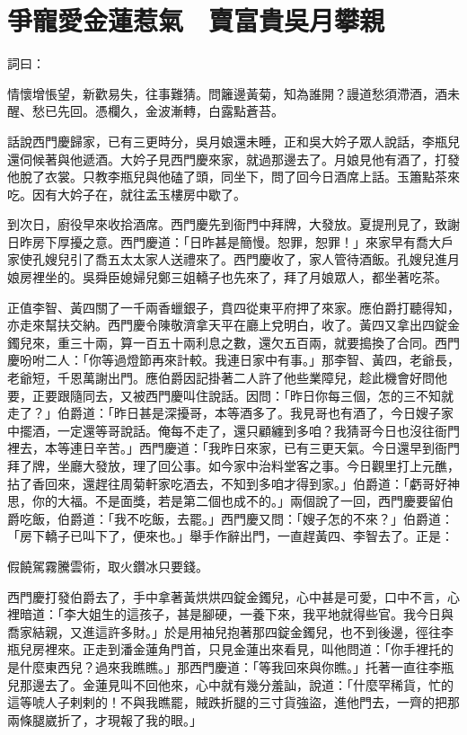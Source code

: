 %

\chapter{爭寵愛金蓮惹氣　賣富貴吳月攀親}

詞曰：

情懷增悵望，新歡易失，往事難猜。問籬邊黃菊，知為誰開？謾道愁須滯酒，酒未醒、愁已先回。憑欄久，金波漸轉，白露點蒼苔。

話說西門慶歸家，已有三更時分，吳月娘還未睡，正和吳大妗子眾人說話，李瓶兒還伺候著與他遞酒。大妗子見西門慶來家，就過那邊去了。月娘見他有酒了，打發他脫了衣裳。只教李瓶兒與他磕了頭，同坐下，問了回今日酒席上話。玉簫點茶來吃。因有大妗子在，就往孟玉樓房中歇了。

到次日，廚役早來收拾酒席。西門慶先到衙門中拜牌，大發放。夏提刑見了，致謝日昨房下厚擾之意。西門慶道：「日昨甚是簡慢。恕罪，恕罪！」來家早有喬大戶家使孔嫂兒引了喬五太太家人送禮來了。西門慶收了，家人管待酒飯。孔嫂兒進月娘房裡坐的。吳舜臣媳婦兒鄭三姐轎子也先來了，拜了月娘眾人，都坐著吃茶。

正值李智、黃四關了一千兩香蠟銀子，賁四從東平府押了來家。應伯爵打聽得知，亦走來幫扶交納。西門慶令陳敬濟拿天平在廳上兌明白，收了。黃四又拿出四錠金鐲兒來，重三十兩，算一百五十兩利息之數，還欠五百兩，就要搗換了合同。西門慶吩咐二人：「你等過燈節再來計較。我連日家中有事。」那李智、黃四，老爺長，老爺短，千恩萬謝出門。應伯爵因記掛著二人許了他些業障兒，趁此機會好問他要，正要跟隨同去，又被西門慶叫住說話。因問：「昨日你每三個，怎的三不知就走了？」伯爵道：「昨日甚是深擾哥，本等酒多了。我見哥也有酒了，今日嫂子家中擺酒，一定還等哥說話。俺每不走了，還只顧纏到多咱？我猜哥今日也沒往衙門裡去，本等連日辛苦。」西門慶道：「我昨日來家，已有三更天氣。今日還早到衙門拜了牌，坐廳大發放，理了回公事。如今家中治料堂客之事。今日觀里打上元醮，拈了香回來，還趕往周菊軒家吃酒去，不知到多咱才得到家。」伯爵道：「虧哥好神思，你的大福。不是面獎，若是第二個也成不的。」兩個說了一回，西門慶要留伯爵吃飯，伯爵道：「我不吃飯，去罷。」西門慶又問：「嫂子怎的不來？」伯爵道：「房下轎子已叫下了，便來也。」舉手作辭出門，一直趕黃四、李智去了。正是：

假饒駕霧騰雲術，取火鑽冰只要錢。

西門慶打發伯爵去了，手中拿著黃烘烘四錠金鐲兒，心中甚是可愛，口中不言，心裡暗道：「李大姐生的這孩子，甚是腳硬，一養下來，我平地就得些官。我今日與喬家結親，又進這許多財。」於是用袖兒抱著那四錠金鐲兒，也不到後邊，徑往李瓶兒房裡來。正走到潘金蓮角門首，只見金蓮出來看見，叫他問道：「你手裡托的是什麼東西兒？過來我瞧瞧。」那西門慶道：「等我回來與你瞧。」托著一直往李瓶兒那邊去了。金蓮見叫不回他來，心中就有幾分羞訕，說道：「什麼罕稀貨，忙的這等唬人子剌剌的！不與我瞧罷，賊跌折腿的三寸貨強盜，進他門去，一齊的把那兩條腿崴折了，才現報了我的眼。」

